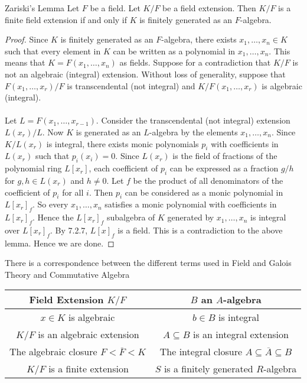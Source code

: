\documentclass[a4paper]{article}
\begin{document}
\begin{thm}{Zariski's Lemma}{} Let $F$ be a field. Let $K/F$ be a field extension. Then $K/F$ is a finite field extension if and only if $K$ is finitely generated as an $F$-algebra. \tcbline
\begin{proof}
Since $K$ is finitely generated as an $F$-algebra, there exists $x_1,\dots,x_n\in K$ such that every element in $K$ can be written as a polynomial in $x_1,\dots,x_n$. This means that $K=F(x_1,\dots,x_n)$ as fields. Suppose for a contradiction that $K/F$ is not an algebraic (integral) extension. Without loss of generality, suppose that $F(x_1,\dots,x_r)/F$ is transcendental (not integral) and $K/F(x_1,\dots,x_r)$ is algebraic (integral). \\~\\

Let $L=F(x_1,\dots,x_{r-1})$. Consider the transcendental (not integral) extension $L(x_r)/L$. Now $K$ is generated as an $L$-algebra by the elements $x_1,\dots,x_n$. Since $K/L(x_r)$ is integral, there exists monic polynomials $p_i$ with coefficients in $L(x_r)$ such that $p_i(x_i)=0$. Since $L(x_r)$ is the field of fractions of the polynomial ring $L[x_r]$, each coefficient of $p_i$ can be expressed as a fraction $g/h$ for $g,h\in L(x_r)$ and $h\neq 0$. Let $f$ be the product of all denominators of the coefficient of $p_i$ for all $i$. Then $p_i$ can be considered as a monic polynomial in $L[x_r]_f$. So every $x_1,\dots,x_n$ satisfies a monic polynomial with coefficients in $L[x_r]_f$. Hence the $L[x_r]_f$ subalgebra of $K$ generated by $x_1,\dots,x_n$ is integral over $L[x_r]_f$. By 7.2.7, $L[x]_f$ is a field. This is a contradiction to the above lemma. Hence we are done. 
\end{proof}
\end{thm}

There is a correspondence between the different terms used in Field and Galois Theory and Commutative Algebra

\begin{table}[!h]
\centering
\begin{tabular}{c|c}
Field Extension $K/F$  & $B$ an $A$-algebra \\ \hline
$x\in K$ is algebraic     & $b\in B$ is integral            \\
$K/F$ is an algebraic extension    & $A\subseteq B$ is an integral extension       \\
The algebraic closure $F<\overline{F}<K$     & The integral closure $A\subseteq\overline{A}\subseteq B$          \\
$K/F$ is a finite extension & $S$ is a finitely generated $R$-algebra
\end{tabular}
\end{table}
\end{document}
